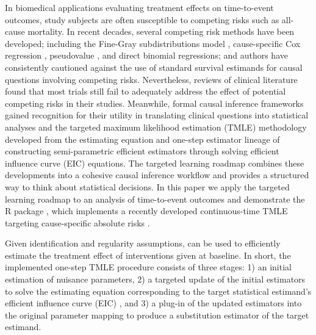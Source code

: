 In biomedical applications evaluating treatment effects on time-to-event outcomes, study subjects are often susceptible to competing risks such as all-cause mortality. In recent decades, several competing risk methods have been developed; including the Fine-Gray subdistributions model \citep{fine_proportional_1999}, cause-specific Cox regression \citep{benichou_estimates_1990}, pseudovalue \citep{klein_regression_2005}, and direct binomial \citep{scheike_predicting_2008, gerds_absolute_2012} regressions; and authors have consistently cautioned against the use of standard survival estimands for causal questions involving competing risks. Nevertheless, reviews of clinical literature \citep{koller_competing_2012, austin_accounting_2017} found that most trials still fail to adequately address the effect of potential competing risks in their studies. Meanwhile, formal causal inference frameworks \citep{rubin_estimating_1974, pearl_causal_2016} gained recognition for their utility in translating clinical questions into statistical analyses and the targeted maximum likelihood estimation (TMLE) \citep{laan_targeted_2011, laan_targeted_2018} methodology developed from the estimating equation and one-step estimator lineage of constructing semi-parametric efficient estimators through solving efficient influence curve (EIC) equations. The targeted learning roadmap \citep{petersen_causal_2014} combines these developments into a cohesive causal inference workflow and provides a structured way to think about statistical decisions. In this paper we apply the targeted learning roadmap to an analysis of time-to-event outcomes and demonstrate the R package , which implements a recently developed continuous-time TMLE targeting cause-specific absolute risks \citep{rytgaard_one-step_2021, rytgaard_targeted_2022, rytgaard_estimation_2023}.

Given identification and regularity assumptions,  can be used to efficiently estimate the treatment effect of interventions given at baseline. In short, the implemented one-step TMLE procedure consists of three stages: 1) an initial estimation of nuisance parameters, 2) a targeted update of the initial estimators to solve the estimating equation corresponding to the target statistical estimand's efficient influence curve (EIC) \citep{laan_unified_2003, kennedy_semiparametric_2016}, and 3) a plug-in of the updated estimators into the original parameter mapping to produce a substitution estimator of the target estimand.

